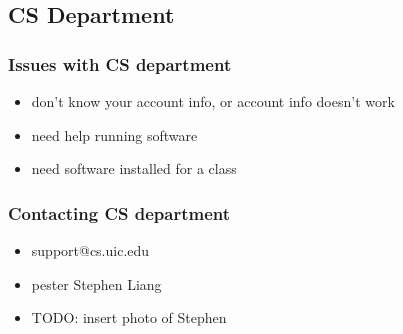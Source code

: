 \documentclass[hyperref={pdfpagelabels=false}]{beamer}
\begin{document}
\subsection{CS Department}
\frame
{
    \frametitle{Issues with CS department}
    \begin{itemize}
    \item{don't know your account info, or account info doesn't work}
    \item{need help running software}
    \item{need software installed for a class}
    \end{itemize}
}
\frame
{
    \frametitle{Contacting CS department}
    \begin{itemize}
    \item{support@cs.uic.edu}
    \item{pester Stephen Liang}
    \item{TODO: insert photo of Stephen}
    \end{itemize}
}
\end{document}
